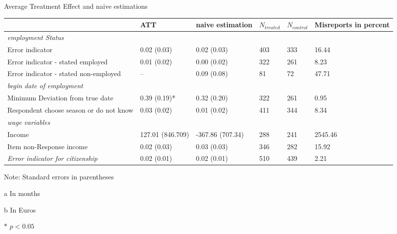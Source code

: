 \begin{threeparttable}
\caption{Average Treatment Effect and naive estimations}
\label{tab:tab_estimates}
\begin{tabular}{p{4.5cm}p{1.5cm}p{1.5cm}p{1cm}p{1cm}p{1.5cm}}
\cmidrule(r{0.25em}){2-6} 
& ATT              & naive \newline estimation & \(N_{treated}\) & \(N_{control}\) & Misreports in percent  \\
\midrule
\textit{employment Status} \\
Error indicator                     & 0.02 (0.03)       & 0.02 (0.03)      & 403        & 333        & 16.44 \\
Error indicator - stated employed        & 0.01 (0.02)      & 0.00 (0.02)      & 322        & 261        & 8.23  \\
Error indicator - stated non-employed    & --                & 0.09 (0.08)      & 81         & 72         & 47.71     \\
\addlinespace
\textit{begin date of employment} \\
Minimum Deviation from true date         & 0.39 (0.19)*     & 0.32 (0.20)      & 322        & 261        & 0.95\tnote{a} \\
Respondent choose season or do not know  & 0.03 (0.02)      & 0.01 (0.02)      & 411        & 344        & 8.34 \\
\addlinespace
\textit{wage variables} \\
Income                              & 127.01 (846.709) & -367.86 (707.34) & 288        & 241        & 2545.46\tnote{b} \\
Item non-Response income                 & 0.02 (0.03)       & 0.03 (0.03)       & 346        & 282        & 15.92        \\
\textit{Error indicator for citizenship} & 0.02 (0.01)      & 0.02 (0.01)      & 510        & 439        & 2.21                
\end{tabular}
\vspace{.5em}
    \begin{tablenotes}\small
    \item Note: Standard errors in parentheses
      
    \item [a] In months \newline
    \item [b] In Euros 
      
    \item $*$ $p<0.05$
    \end{tablenotes}
\end{threeparttable}
